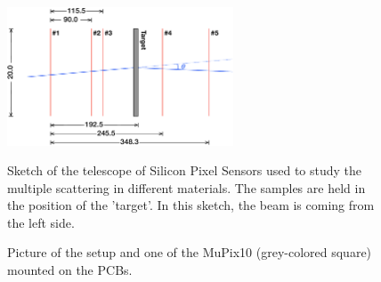 \begin{refsection}
        \begin{figure}
            \centering
            \includegraphics[width=0.6\textwidth]{Figures/muEDM_Dec2021/Positions_Telescope.png}\\
            \caption{Sketch of the telescope of Silicon Pixel Sensors used to study the multiple scattering in different materials.
            The samples are held in the position of the 'target'. 
            In this sketch, the beam is coming from the left side.}
            \label{fig:muEDM:beamtime2021:telescope}
        \end{figure}

        \begin{figure}   
            \centering
            \hfill
            \caption{Picture of the setup and one of the MuPix10 (grey-colored square) mounted on the PCBs.}
            \label{fig:muEDM:beamtime2021:setup}
        \end{figure}


\end{refsection}
